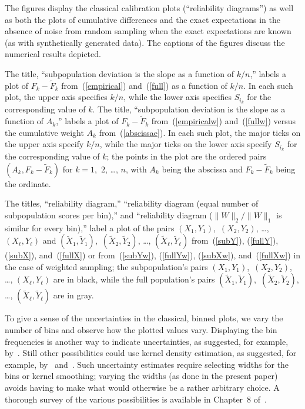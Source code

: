 \documentclass{article}
\begin{document}
The figures display the classical calibration plots (``reliability diagrams'')
as well as both the plots of cumulative differences and the exact expectations
in the absence of noise from random sampling when the exact expectations
are known (as with synthetically generated data).
The captions of the figures discuss the numerical results depicted.

The title, ``subpopulation deviation is the slope as a function of $k/n$,''
labels a plot of $F_k-\tilde{F}_k$
from~(\ref{empirical}) and~(\ref{full}) as a function of $k/n$.
In each such plot, the upper axis specifies $k/n$,
while the lower axis specifies $S_{i_k}$ for the corresponding value of $k$.
The title, ``subpopulation deviation is the slope as a function of $A_k$,''
labels a plot of $F_k-\tilde{F}_k$
from~(\ref{empiricalw}) and~(\ref{fullw}) versus 
the cumulative weight $A_k$ from~(\ref{abscissae}).
In each such plot, the major ticks on the upper axis specify $k/n$,
while the major ticks on the lower axis specify $S_{i_k}$
for the corresponding value of $k$; the points in the plot
are the ordered pairs $(A_k, F_k-\tilde{F}_k)$ for $k = 1$,~$2$, \dots, $n$,
with $A_k$ being the abscissa and $F_k-\tilde{F}_k$ being the ordinate.

The titles, ``reliability diagram,''
``reliability diagram (equal number of subpopulation scores per bin),''
and ``reliability diagram ($\|W\|_2/\|W\|_1$ is similar for every bin),''
label a plot of the pairs
$(X_1, Y_1)$,~$(X_2, Y_2)$, \dots, $(X_{\ell}, Y_{\ell})$ and
$(\tilde{X}_1, \tilde{Y}_1)$,~$(\tilde{X}_2, \tilde{Y}_2)$, \dots,
$(\tilde{X}_{\ell}, \tilde{Y}_{\ell})$
from~(\ref{subY}), (\ref{fullY}), (\ref{subX}), and~(\ref{fullX})
or from~(\ref{subYw}), (\ref{fullYw}), (\ref{subXw}), and~(\ref{fullXw})
in the case of weighted sampling; the subpopulation's pairs
$(X_1, Y_1)$,~$(X_2, Y_2)$, \dots, $(X_{\ell}, Y_{\ell})$
are in black, while the full population's pairs
$(\tilde{X}_1, \tilde{Y}_1)$,~$(\tilde{X}_2, \tilde{Y}_2)$, \dots,
$(\tilde{X}_{\ell}, \tilde{Y}_{\ell})$ are in gray.

To give a sense of the uncertainties in the classical, binned plots,
we vary the number of bins and observe how the plotted values vary.
Displaying the bin frequencies is another way to indicate uncertainties,
as suggested, for example, by~\cite{murphy-winkler}.
Still other possibilities could use kernel density estimation,
as suggested, for example, by~\cite{brocker} and~\cite{wilks}.
Such uncertainty estimates require selecting widths for the bins
or kernel smoothing; varying the widths (as done in the present paper)
avoids having to make what would otherwise be a rather arbitrary choice.
A thorough survey of the various possibilities is available
in Chapter~8 of~\cite{wilks}.
\end{document}
